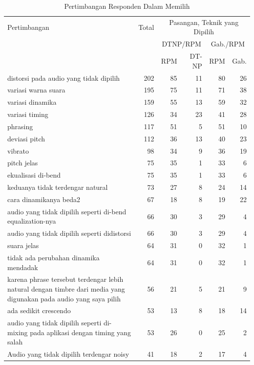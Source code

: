 	\begin{longtable}{|p{}|r|r|r|r|r|}
	\caption{Pertimbangan Responden Dalam Memilih}\label{tab-pertimbangan}\\
	\hline
Pertimbangan&	Total&	\multicolumn{4}{|c|}{Pasangan, Teknik yang Dipilih}\\
\cline{3-6}
&	&	\multicolumn{2}{|c|}{DTNP/RPM}	&\multicolumn{2}{|c|}{Gab./RPM}\\
\cline{3-6}
&	&	RPM&	DT-NP&	RPM&	Gab.\\\hline
\endhead
distorsi pada audio yang tidak dipilih&	202&	85&	11&	80&	26\\\hline
variasi warna suara&	195&	75&	11&	71&	38\\\hline
variasi dinamika&	159&	55&	13&	59&	32\\\hline
variasi timing&	126&	34&	23&	41&	28\\\hline
phrasing&	117&	51&	5&	51&	10\\\hline
deviasi pitch&	112&	36&	13&	40&	23\\\hline
vibrato&	98&	34&	9&	36&	19\\\hline
pitch jelas&	75&	35&	1&	33&	6\\\hline
ekualisasi di-bend&	75&	35&	1&	33&	6\\\hline
keduanya tidak terdengar natural&	73&	27&	8&	24&	14\\\hline
cara dinamikanya beda2&	67&	18&	8&	19&	22\\\hline
audio yang tidak dipilih seperti di-bend equalization-nya&	66&	30&	3&	29&	4\\\hline
audio yang tidak dipilih seperti didistorsi&	66&	30&	3&	29&	4\\\hline
suara jelas&	64&	31&	0&	32&	1\\\hline
tidak ada perubahan dinamika mendadak&	64&	31&	0&	32&	1\\\hline
karena phrase tersebut terdengar lebih natural dengan timbre dari media yang digunakan pada audio yang saya pilih&	56&	21&	5&	21&	9\\\hline
ada sedikit crescendo&	53&	13&	8&	18&	14\\\hline
audio yang tidak dipilih seperti di-mixing pada aplikasi dengan timing yang salah&	53&	26&	0&	25&	2\\\hline
Audio yang tidak dipilih terdengar noisy&	41&	18&	2&	17&	4\\\hline

\end{longtable}
